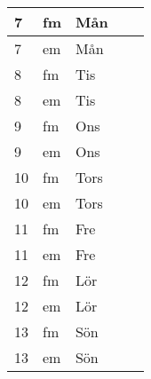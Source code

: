 \documentclass[a4paper]{article}
\begin{document}
\begin{table}[ht!]
\begin{tabular}{lllp{7cm}p{7cm}}
\multicolumn{1}{|l|}{7} & \multicolumn{1}{l|}{fm} & \multicolumn{1}{l|}{Mån} & \multicolumn{1}{l|}{} & \multicolumn{1}{l|}{} \\ \hline
\multicolumn{1}{|l|}{7} & \multicolumn{1}{l|}{em} & \multicolumn{1}{l|}{Mån} & \multicolumn{1}{l|}{} & \multicolumn{1}{l|}{} \\ \hline    

\multicolumn{1}{|l|}{8} & \multicolumn{1}{l|}{fm} & \multicolumn{1}{l|}{Tis} & \multicolumn{1}{l|}{} & \multicolumn{1}{l|}{} \\ \hline
\multicolumn{1}{|l|}{8} & \multicolumn{1}{l|}{em} & \multicolumn{1}{l|}{Tis} & \multicolumn{1}{l|}{} & \multicolumn{1}{l|}{} \\ \hline    

\multicolumn{1}{|l|}{9} & \multicolumn{1}{l|}{fm} & \multicolumn{1}{l|}{Ons} & \multicolumn{1}{l|}{} & \multicolumn{1}{l|}{} \\ \hline
\multicolumn{1}{|l|}{9} & \multicolumn{1}{l|}{em} & \multicolumn{1}{l|}{Ons} & \multicolumn{1}{l|}{} & \multicolumn{1}{l|}{} \\ \hline    

\multicolumn{1}{|l|}{10} & \multicolumn{1}{l|}{fm} & \multicolumn{1}{l|}{Tors} & \multicolumn{1}{l|}{} & \multicolumn{1}{l|}{} \\ \hline
\multicolumn{1}{|l|}{10} & \multicolumn{1}{l|}{em} & \multicolumn{1}{l|}{Tors} & \multicolumn{1}{l|}{} & \multicolumn{1}{l|}{} \\ \hline    

\multicolumn{1}{|l|}{11} & \multicolumn{1}{l|}{fm} & \multicolumn{1}{l|}{Fre} & \multicolumn{1}{l|}{} & \multicolumn{1}{l|}{} \\ \hline
\multicolumn{1}{|l|}{11} & \multicolumn{1}{l|}{em} & \multicolumn{1}{l|}{Fre} & \multicolumn{1}{l|}{} & \multicolumn{1}{l|}{} \\ \hline    

\multicolumn{1}{|l|}{12} & \multicolumn{1}{l|}{fm} & \multicolumn{1}{l|}{Lör} & \multicolumn{1}{l|}{} & \multicolumn{1}{l|}{} \\ \hline
\multicolumn{1}{|l|}{12} & \multicolumn{1}{l|}{em} & \multicolumn{1}{l|}{Lör} & \multicolumn{1}{l|}{} & \multicolumn{1}{l|}{} \\ \hline    

\multicolumn{1}{|l|}{13} & \multicolumn{1}{l|}{fm} & \multicolumn{1}{l|}{Sön} & \multicolumn{1}{l|}{} & \multicolumn{1}{l|}{} \\ \hline
\multicolumn{1}{|l|}{13} & \multicolumn{1}{l|}{em} & \multicolumn{1}{l|}{Sön} & \multicolumn{1}{l|}{} & \multicolumn{1}{l|}{} \\ \hline    


\end{tabular}
\end{table}
\end{document}
